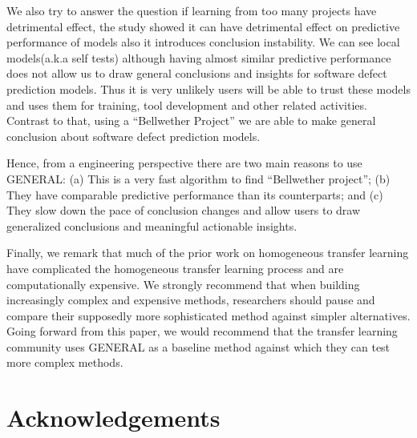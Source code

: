\documentclass[10pt,journal,compsoc]{IEEEtran}
\begin{document}
We also try to answer the question if learning from too many projects have detrimental effect, the study showed it can have detrimental effect on predictive performance of models also it introduces conclusion instability. We can see local models(a.k.a self tests) although having almost similar predictive performance does not allow us to draw general conclusions and insights for software defect prediction models. Thus it is very unlikely users will be able to trust these models and uses them for training, tool development and other related activities. Contrast to that, using a ``Bellwether Project'' we are able to make general conclusion about software defect prediction models. 
 
Hence, from a  engineering perspective there are two main reasons to use GENERAL: (a) This is a very fast algorithm to find ``Bellwether project'';  (b) They have comparable predictive performance than its counterparts; and (c) They slow down the pace of conclusion changes and allow users to draw generalized conclusions and meaningful actionable insights.

Finally, we remark that much of the prior work on homogeneous transfer learning have complicated the homogeneous transfer learning process and are computationally expensive. We strongly recommend that when building increasingly complex and expensive  methods, researchers should pause and compare their supposedly more sophisticated method against simpler alternatives. Going forward from this paper, we would recommend that the transfer learning community uses GENERAL as a baseline method against which they can test more complex methods.




\section{Acknowledgements}
\label{sec:ack}



 
 \balance

% 
\end{document}
